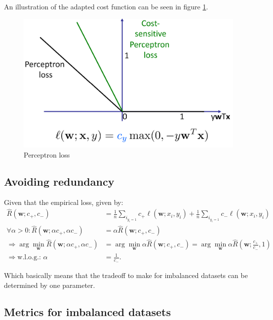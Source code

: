 \documentclass[a4paper,10pt,twoside]{article}
\begin{document}
An illustration of the adapted cost function can be seen in figure \ref{perceptron-class-sensitive-loss}.

\begin{figure}
    \centering
    \includegraphics[width=.5\textwidth]{figures/perceptron-class-sensitive-loss.png}
    \caption{Perceptron loss}
    \label{perceptron-class-sensitive-loss}
\end{figure}

\subsection{Avoiding redundancy}

Given that the empirical loss, given by:
\begin{align*}
    \hat{R}(\mathbf{w};c_+,c_-) &= \frac{1}{n}\sum_{i_{y_i=1}}c_+\ell(\mathbf{w};x_i,y_i)+\frac{1}{n}\sum_{i_{y_i=1}}c_-\ell(\mathbf{w};x_i,y_i)\\
    \forall\alpha>0:\hat{R}(\mathbf{w};\alpha c_+, \alpha c_-) &=\alpha\hat{R}(\mathbf{w};c_+,c_-)\\
    \Rightarrow \arg\min_{\mathbf{w}}\hat{R}(\mathbf{w};\alpha c_+, \alpha c_-)&=\arg\min_{\mathbf{w}}\alpha \hat{R}(\mathbf{w}; c_+, c_-)=\arg\min_{\mathbf{w}}\alpha \hat{R}(\mathbf{w}; \frac{c_+}{c_-}, 1)\\
    \Rightarrow \text{w.l.o.g.: } \alpha&=\frac{1}{c_{-}}.
\end{align*}

Which basically means that the tradeoff to make for imbalanced datasets can be determined by one parameter.

\subsection{Metrics for imbalanced datasets}
\end{document}
